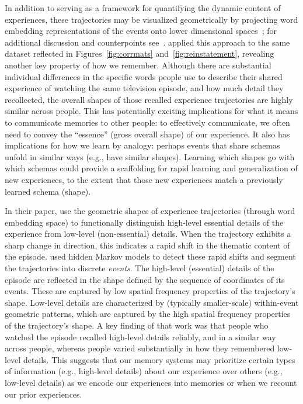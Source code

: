 \documentclass{article}
\begin{document}
In addition to serving as a framework for quantifying the dynamic content of experiences, these trajectories may be visualized geometrically by projecting word embedding representations of the events onto lower dimensional spaces~\citep[e.g., ][]{HeusEtal18a}; for additional discussion and counterpoints see~\cite{JollChan18}.  \cite{HeusEtal18c} applied this approach to the same dataset reflected in Figures~\ref{fig:corrmats} and~\ref{fig:reinstatement}, revealing another key property of how we remember.  Although there are substantial individual differences in the specific words people use to describe their shared experience of watching the same television episode, and how much detail they recollected, the overall shapes of those recalled experience trajectories are highly similar across people.  This has potentially exciting implications for what it means to communicate memories to other people: to effectively communicate, we often need to convey the ``essence'' (gross overall shape) of our experience.  It also has implications for how we learn by analogy: perhaps events that share schemas~\citep[e.g., ][]{BaldEtal18}  unfold in similar ways (e.g., have similar shapes).  Learning which shapes go with which schemas could provide a scaffolding for rapid learning and generalization of new experiences, to the extent that those new experiences match a previously learned schema (shape).

In their paper, \cite{HeusEtal18c} use the geometric shapes of experience trajectories (through word embedding space) to functionally distinguish high-level essential details of the experience from low-level (non-essential) details.  When the trajectory exhibits a sharp change in direction, this indicates a rapid shift in the thematic content of the episode.  \cite{HeusEtal18c} used hidden Markov models to detect these rapid shifts and segment the trajectories into discrete \textit{events}.  The high-level (essential) details of the episode are reflected in the shape defined by the sequence of coordinates of its events.  These are captured by low spatial frequency properties of the trajectory's shape.  Low-level details are characterized by (typically smaller-scale) within-event geometric patterns, which are captured by the high spatial frequency properties of the trajectory's shape.  A key finding of that work was that people who watched the episode recalled high-level details reliably, and in a similar way across people, whereas people varied substantially in how they remembered low-level details.  This suggests that our memory systems may prioritize certain types of information (e.g., high-level details) about our experience over others (e.g., low-level details) as we encode our experiences into memories or when we recount our prior experiences.
\end{document}
